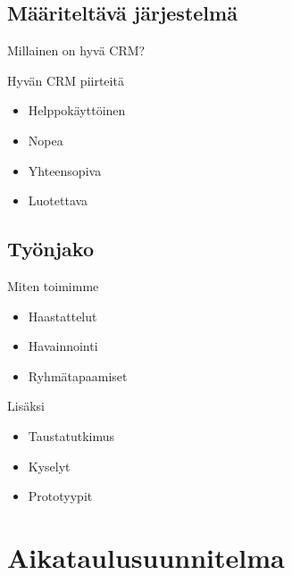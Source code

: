 \documentclass{beamer}
\begin{document}
\subsection{Määriteltävä järjestelmä}

\begin{frame}{Millainen on hyvä CRM?}

Hyvän CRM piirteitä

	\begin{itemize}
		\item<2-> Helppokäyttöinen
		\item<3-> Nopea
		\item<4-> Yhteensopiva
		\item<5-> Luotettava
	\end{itemize}
\end{frame}

\subsection{Työnjako}

\begin{frame}{Miten toimimme}

	\begin{itemize}
		\item <2-> Haastattelut
		\item <3-> Havainnointi
		\item <4-> Ryhmätapaamiset
	\end{itemize}

 Lisäksi

	\begin{itemize}
		\item<6-> Taustatutkimus
		\item<7-> Kyselyt
		\item<8-> Prototyypit
	\end{itemize}

\end{frame}


\section{Aikataulu\-suunnitelma}
\end{document}
